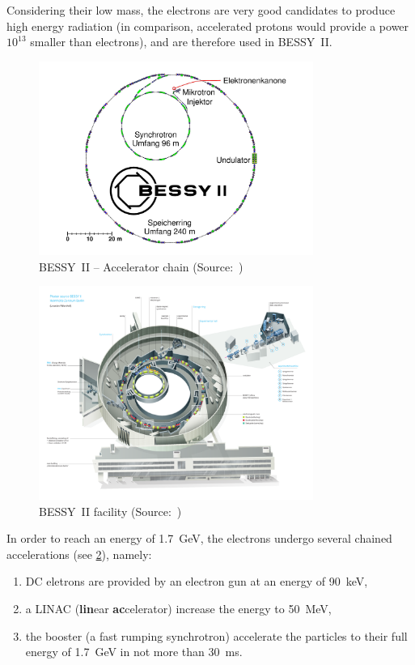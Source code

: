 Considering their low mass, the electrons are very good candidates to produce high energy radiation (in comparison, accelerated protons would provide a power $10^{13}$ smaller than electrons), and are therefore used in BESSY~II.

\begin{figure}
    \centering
    \includegraphics[width=0.8\textwidth]{img/bessy_acc_chain_web.jpg}
    \caption[BESSY~II -- Accelerator chain]{\label{fig:bessy_acc_web_simple} BESSY~II -- Accelerator chain (Source:~\cite{web:bessy_homepage})}
\end{figure}

\begin{figure}
    \centering
    \includegraphics[width=0.8\textwidth,height=0.8\textheight,keepaspectratio]{img/bessy_acc_web.pdf}
    \caption[BESSY~II facility]{\label{fig:bessy_acc_web} BESSY~II facility (Source:~\cite{web:bessy_homepage})}
\end{figure}

In order to reach an energy of \SI{1.7}{\giga\electronvolt}, the electrons undergo several chained accelerations (see \cref{fig:bessy_acc_web}), namely:
\begin{enumerate}
    \item DC eletrons are provided by an electron gun at an energy of \SI{90}{\kilo\electronvolt},
    \item a LINAC (\textbf{lin}ear \textbf{ac}celerator) increase the energy to \SI{50}{\mega\electronvolt},
    \item the booster (a fast rumping synchrotron) accelerate the particles to their full energy of \SI{1.7}{\giga\electronvolt} in not more than \SI{30}{\milli\second}.
\end{enumerate}

